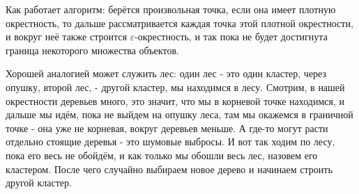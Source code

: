 Как работает алгоритм: берётся произвольная точка, если она имеет плотную окрестность, то дальше рассматривается каждая точка этой плотной окрестности, и вокруг неё также строится $\varepsilon$-окрестность, и так пока не будет достигнута граница некоторого множества объектов. 

Хорошей аналогией может служить лес: один лес - это один кластер, через опушку, второй лес, - другой кластер, мы находимся в лесу. Смотрим, в нашей окрестности деревьев много, это значит, что мы в корневой точке находимся, и дальше мы идём, пока не выйдем на опушку леса, там мы окажемся в граничной точке - она уже не корневая, вокруг деревьев меньше. А где-то могут расти отдельно стоящие деревья - это шумовые выбросы. И вот так ходим по лесу, пока его весь не обойдём, и как только мы обошли весь лес, назовем его кластером. После чего случайно выбираем новое дерево и начинаем строить другой кластер.


